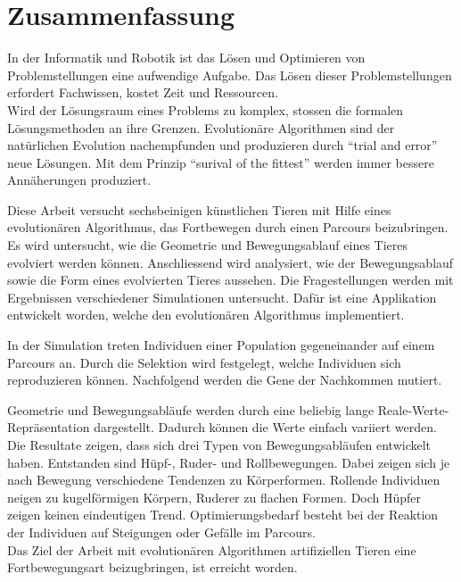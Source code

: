 %
%


\chapter{Zusammenfassung}

  In der Informatik und Robotik ist das Lösen und Optimieren von Problemstellungen eine aufwendige Aufgabe.
  Das Lösen dieser Problemstellungen erfordert Fachwissen, kostet Zeit und Ressourcen.
  \\
  Wird der Lösungsraum eines Problems zu komplex, stossen die formalen Lösungsmethoden an ihre Grenzen.
  Evolutionäre Algorithmen sind der natürlichen Evolution nachempfunden und
  produzieren durch ``trial and error'' neue Lösungen.
  Mit dem Prinzip ``surival of the fittest'' werden immer bessere Annäherungen produziert.

  \smallskip

  Diese Arbeit versucht sechsbeinigen künstlichen Tieren mit Hilfe eines evolutionären Algorithmus,
  das Fortbewegen durch einen Parcours beizubringen.
  Es wird untersucht, wie die Geometrie und Bewegungsablauf eines Tieres evolviert werden können.
  Anschliessend wird analysiert, wie der Bewegungsablauf sowie die Form eines evolvierten Tieres aussehen.
  Die Fragestellungen werden mit Ergebnissen verschiedener Simulationen untersucht.
  Dafür ist eine Applikation entwickelt worden, welche den evolutionären Algorithmus implementiert.

  \smallskip

  In der Simulation treten Individuen einer Population gegeneinander auf einem Parcours an.
  Durch die Selektion wird festgelegt, welche Individuen sich reproduzieren können.
  Nachfolgend werden die Gene der Nachkommen mutiert.

  \smallskip

  Geometrie und Bewegungsabläufe werden durch eine beliebig lange Reale-Werte-Repräsentation dargestellt.
  Dadurch können die Werte einfach variiert werden.
  Die Resultate zeigen, dass sich drei Typen von Bewegungsabläufen entwickelt haben.
  Entstanden sind Hüpf-, Ruder- und Rollbewegungen.
  Dabei zeigen sich je nach Bewegung verschiedene Tendenzen zu Körperformen.
  Rollende Individuen neigen zu kugelförmigen Körpern, Ruderer zu flachen Formen.
  Doch Hüpfer zeigen keinen eindeutigen Trend.
  Optimierungsbedarf besteht bei der Reaktion der Individuen auf Steigungen oder Gefälle im Parcours.
  \\
  Das Ziel der Arbeit mit evolutionären Algorithmen artifiziellen Tieren eine Fortbewegungsart beizugbringen,
  ist erreicht worden.
